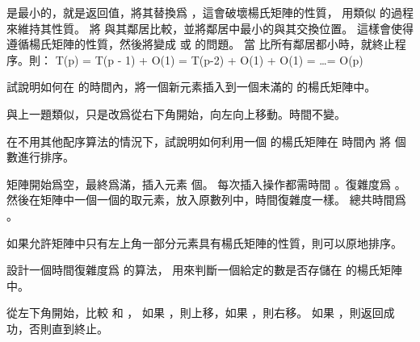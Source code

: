 \startANSWER
{} 是最小的，就是返回值，將其替換爲 \m{\infty}，這會破壞楊氏矩陣的性質，
用類似  的過程來維持其性質。
將  與其鄰居比較，並將鄰居中最小的與其交換位置。
這樣會使得  遵循楊氏矩陣的性質，然後將變成  或  的問題。
當  比所有鄰居都小時，就終止程序。則：
\startformula
T(p) = T(p - 1) + O(1) = T(p-2) + O(1) + O(1) = \ldots = O(p)
\stopformula
\stopANSWER

\startigBase[continue]\startitem
試說明如何在  的時間內，將一個新元素插入到一個未滿的  的楊氏矩陣中。
\stopitem\stopigBase

\startANSWER
與上一題類似，只是改爲從右下角開始，向左向上移動。時間不變。
\stopANSWER

\startigBase[continue]\startitem
在不用其他配序算法的情況下，試說明如何利用一個  的楊氏矩陣在  時間內
將  個數進行排序。
\stopitem\stopigBase

\startANSWER
矩陣開始爲空，最終爲滿，插入元素  個。
每次插入操作都需時間 。復雜度爲 。
然後在矩陣中一個一個的取元素，放入原數列中，時間復雜度一樣。
總共時間爲 。

如果允許矩陣中只有左上角一部分元素具有楊氏矩陣的性質，則可以原地排序。
\stopANSWER

\startigBase[continue]\startitem
設計一個時間復雜度爲  的算法，
用來判斷一個給定的數是否存儲在  的楊氏矩陣中。
\stopitem\stopigBase

\startANSWER
從左下角開始，比較  和 ，
如果 ，則上移，如果 ，則右移。
如果 ，則返回成功，否則直到終止。
\stopANSWER

\stopPROBLEM

\stopsubject
